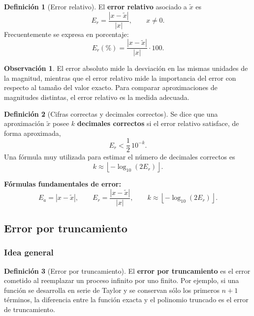 \documentclass[a4paper,12pt]{article}
\theoremstyle{definition}
\newtheorem{definicion}{Definición}[section]
\newtheorem{observacion}{Observación}[section]
\theoremstyle{plain}
\begin{document}
\begin{definicion}[Error relativo]
El \textbf{error relativo} asociado a $\tilde{x}$ es
\[
    E_r = \frac{|x - \tilde{x}|}{|x|},
    \qquad x \neq 0.
\]
Frecuentemente se expresa en porcentaje:
\[
    E_r(\%) = \frac{|x - \tilde{x}|}{|x|} \cdot 100.
\]
\end{definicion}

\begin{observacion}
El error absoluto mide la desviación en las mismas unidades de la magnitud,
mientras que el error relativo mide la importancia del error con respecto al
tamaño del valor exacto. Para comparar aproximaciones de magnitudes distintas,
el error relativo es la medida adecuada.
\end{observacion}

\begin{definicion}[Cifras correctas y decimales correctos]
Se dice que una aproximación $\tilde{x}$ posee $k$ \textbf{decimales correctos}
si el error relativo satisface, de forma aproximada,
\[
    E_r < \frac{1}{2}\,10^{-k}.
\]
Una fórmula muy utilizada para estimar el número de decimales correctos es
\[
    k \approx \left\lfloor -\log_{10}(2E_r)\right\rfloor.
\]
\end{definicion}

\begin{cajaresultado}
\textbf{Fórmulas fundamentales de error:}
\[
    E_a = |x - \tilde{x}|,
    \qquad
    E_r = \frac{|x - \tilde{x}|}{|x|},
    \qquad
    k \approx \left\lfloor -\log_{10}(2E_r) \right\rfloor.
\]
\end{cajaresultado}

\subsection{Error por truncamiento}

\subsubsection{Idea general}

\begin{definicion}[Error por truncamiento]
El \textbf{error por truncamiento} es el error cometido al reemplazar un proceso
infinito por uno finito. Por ejemplo, si una función se desarrolla en serie de
Taylor y se conservan sólo los primeros $n+1$ términos, la diferencia entre la
función exacta y el polinomio truncado es el error de truncamiento.
\end{definicion}
\end{document}
